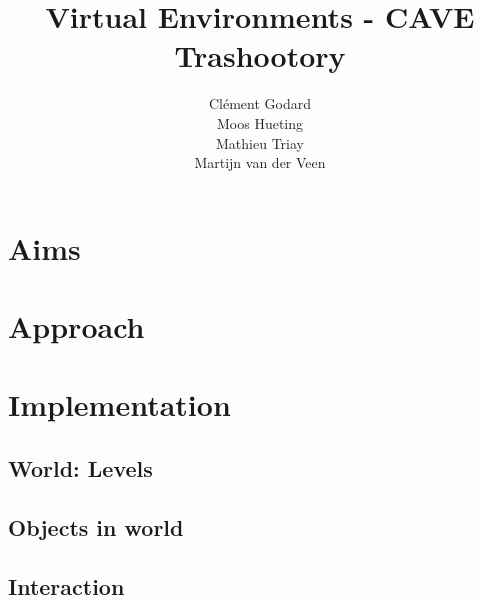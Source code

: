 \documentclass[11pt]{article}
\title{Virtual Environments - CAVE \\ Trashootory}
\author{Cl\'ement Godard \\
        Moos Hueting \\   
        Mathieu Triay \\  
        Martijn van der Veen}
\begin{document}
\maketitle

\tableofcontents
\pagebreak







\section{Aims}


\section{Approach}


\section{Implementation}

\subsection{World: Levels}

\subsection{Objects in world}

\subsection{Interaction}
\end{document}
